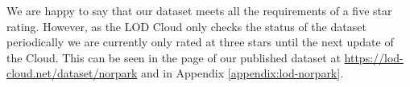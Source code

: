 \vspace{5mm}

We are happy to say that our dataset meets all the requirements of a five star rating. 
However, as the LOD Cloud only checks the status of the dataset periodically we are currently only rated at three stars until the next update of the Cloud. This can be seen in the page of our published dataset at \url{https://lod-cloud.net/dataset/norpark} and in Appendix \ref{appendix:lod-norpark}.


